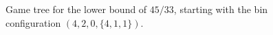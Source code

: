 \newpage
\begin{figure}[H]
\centering
{}%
\caption{Game tree for the lower bound of $45/33$, starting with the bin configuration $(4,2,0,\{4,1,1\})$.}
\end{figure}
\clearpage